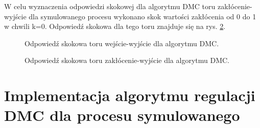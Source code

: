 \documentclass[a4paper,titlepage,11pt,twosides,floatssmall]{mwrep}
\begin{document}
W celu wyznaczenia odpowiedzi skokowej dla algorytmu DMC toru zakłócenie-wyjście dla symulowanego procesu wykonano skok wartości zakłócenia od 0 do 1 w chwili k=0. Odpowiedź skokowa dla tego toru znajduje się na rys. \ref{skok_DMC_zak}.

\begin{figure}[H]
	\centering
	
	\caption{Odpowiedź skokowa toru wejście-wyjście dla algorytmu DMC.}
	\label{skok_DMC_ster}
\end{figure}


\begin{figure}[H]
	\centering
	
	\caption{Odpowiedź skokowa toru zakłócenie-wyjście dla algorytmu DMC.}
	\label{skok_DMC_zak}
\end{figure}

\section{Implementacja algorytmu regulacji DMC dla procesu symulowanego}
\end{document}
